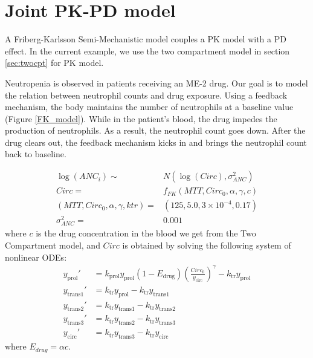 \documentclass[10pt, reqno, oneside]{amsbook}
\numberwithin{equation}{chapter}
\numberwithin{figure}{chapter}
\numberwithin{table}{chapter}
\theoremstyle{remark}
\begin{document}
\section{Joint PK-PD model}
\label{sec:org85e2713}

A Friberg-Karlsson Semi-Mechanistic model \cite{friberg_mechanistic_2003} couples
a PK model with a PD
effect. In the current example, we use the two compartment model in section \ref{sec:twocpt} for
PK model.

Neutropenia is observed in patients receiving an ME-2 drug. Our goal
is to model the relation between neutrophil counts and drug
exposure. Using a feedback mechanism, the body maintains the number of
neutrophils at a baseline value (Figure \ref{FK_model}). While in the
patient's blood, the drug impedes the production of neutrophils. As a
result, the neutrophil count goes down. After the drug clears out, the
feedback mechanism kicks in and brings the neutrophil count back to
baseline.

\begin{align}
  \log(ANC_i) \sim& N(\log(Circ), \sigma^2_{ANC})  \\
  Circ =& f_{FK}(MTT, Circ_{0}, \alpha, \gamma, c)  \\
  (MTT, Circ_{0}, \alpha, \gamma, ktr) =& (125, 5.0, 3 \times 10^{-4}, 0.17) \\
  \sigma^2_{ANC} =& 0.001
\end{align}
where \(c\) is the drug concentration in the blood we get from the Two
Compartment model, and \(Circ\) is obtained by solving the following
system of nonlinear ODEs:
\begin{subequations}
  \begin{align}
   y_\mathrm{prol}' &= k_\mathrm{prol} y_\mathrm{prol} (1 - E_\mathrm{drug})\left(\frac{Circ_0}{y_\mathrm{circ}}\right)^\gamma - k_\mathrm{tr}y_\mathrm{prol} \\
   y_\mathrm{trans1}' &= k_\mathrm{tr} y_\mathrm{prol} - k_\mathrm{tr} y_\mathrm{trans1} \\
   y_\mathrm{trans2}' &= k_\mathrm{tr} y_\mathrm{trans1} - k_\mathrm{tr} y_\mathrm{trans2}  \\
   y_\mathrm{trans3}' &= k_\mathrm{tr} y_\mathrm{trans2} - k_\mathrm{tr} y_\mathrm{trans3}  \\
   y_\mathrm{circ}' &= k_\mathrm{tr} y_\mathrm{trans3} - k_\mathrm{tr} y_\mathrm{circ}
   \end{align}
   \label{eq:FK}
\end{subequations}
where \(E_{drug}  = \alpha c\).
\end{document}
